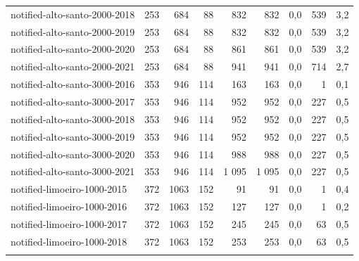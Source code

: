 \documentclass[a4paper,11pt]{article}
\begin{document}
\begin{table}[!ht]
{\begin{tabular}{lrrrrrrrr}
\rowcolor[HTML]{9B9B9B} 
notified-alto-santo-2000-2018 & 253  & 684  & 88  & 832    & 832    & 0,0  & 539     & 3,2                         \\
\rowcolor[HTML]{9B9B9B} 
notified-alto-santo-2000-2019 & 253  & 684  & 88  & 832    & 832    & 0,0  & 539     & 3,2                         \\
\rowcolor[HTML]{9B9B9B} 
notified-alto-santo-2000-2020 & 253  & 684  & 88  & 861    & 861    & 0,0  & 539     & 3,2                         \\
\rowcolor[HTML]{9B9B9B} 
notified-alto-santo-2000-2021 & 253  & 684  & 88  & 941    & 941    & 0,0  & 714     & 2,7                         \\ \hline
\rowcolor[HTML]{9B9B9B} 
notified-alto-santo-3000-2016 & 353  & 946  & 114 & 163    & 163    & 0,0  & 1       & 0,1                         \\
\rowcolor[HTML]{9B9B9B} 
notified-alto-santo-3000-2017 & 353  & 946  & 114 & 952    & 952    & 0,0  & 227     & 0,5                         \\
\rowcolor[HTML]{9B9B9B} 
notified-alto-santo-3000-2018 & 353  & 946  & 114 & 952    & 952    & 0,0  & 227     & 0,5                         \\
\rowcolor[HTML]{9B9B9B} 
notified-alto-santo-3000-2019 & 353  & 946  & 114 & 952    & 952    & 0,0  & 227     & 0,5                         \\
\rowcolor[HTML]{9B9B9B} 
notified-alto-santo-3000-2020 & 353  & 946  & 114 & 988    & 988    & 0,0  & 227     & 0,5                         \\
\rowcolor[HTML]{9B9B9B} 
notified-alto-santo-3000-2021 & 353  & 946  & 114 & 1 095  & 1 095  & 0,0  & 227     & 0,5                         \\ \hline
\rowcolor[HTML]{9B9B9B} 
notified-limoeiro-1000-2015   & 372  & 1063 & 152 & 91     & 91     & 0,0  & 1       & 0,4                         \\
\rowcolor[HTML]{9B9B9B} 
notified-limoeiro-1000-2016   & 372  & 1063 & 152 & 127    & 127    & 0,0  & 1       & 0,2                         \\
\rowcolor[HTML]{9B9B9B} 
notified-limoeiro-1000-2017   & 372  & 1063 & 152 & 245    & 245    & 0,0  & 63      & 0,5                         \\
\rowcolor[HTML]{9B9B9B} 
notified-limoeiro-1000-2018   & 372  & 1063 & 152 & 253    & 253    & 0,0  & 63      & 0,5                         \\
\rowcolor[HTML]{9B9B9B} 

\end{tabular}}
\end{table}
\end{document}
